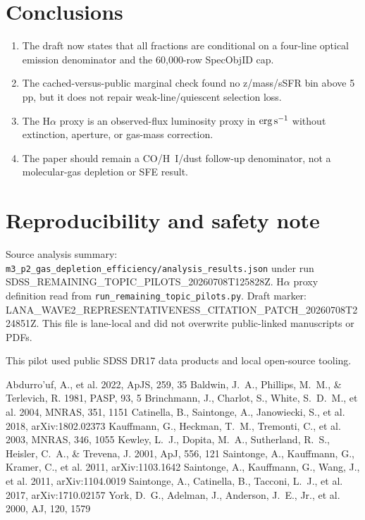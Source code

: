 \documentclass[twocolumn]{aastex631}
\begin{document}
\section{Conclusions}\label{sec:m3p2-conclusions}
\begin{enumerate}
\item The draft now states that all fractions are conditional on a four-line optical emission denominator and the 60,000-row SpecObjID cap.
\item The cached-versus-public marginal check found no z/mass/sSFR bin above 5 pp, but it does not repair weak-line/quiescent selection loss.
\item The H$\alpha$ proxy is an observed-flux luminosity proxy in ${\rm erg\,s^{-1}}$ without extinction, aperture, or gas-mass correction.
\item The paper should remain a CO/H~I/dust follow-up denominator, not a molecular-gas depletion or SFE result.
\end{enumerate}

\section*{Reproducibility and safety note}
Source analysis summary: \texttt{m3\_p2\_gas\_depletion\_efficiency/analysis\_results.json} under run SDSS\_REMAINING\_TOPIC\_PILOTS\_20260708T125828Z.  H$\alpha$ proxy definition read from \texttt{run\_remaining\_topic\_pilots.py}.  Draft marker: LANA\_WAVE2\_REPRESENTATIVENESS\_CITATION\_PATCH\_20260708T224851Z.  This file is lane-local and did not overwrite public-linked manuscripts or PDFs.

\acknowledgments
This pilot used public SDSS DR17 data products and local open-source tooling.

\begin{thebibliography}{}
 Abdurro'uf, A., et al. 2022, ApJS, 259, 35
 Baldwin, J.~A., Phillips, M.~M., \& Terlevich, R. 1981, PASP, 93, 5
 Brinchmann, J., Charlot, S., White, S.~D.~M., et al. 2004, MNRAS, 351, 1151
 Catinella, B., Saintonge, A., Janowiecki, S., et al. 2018, arXiv:1802.02373
 Kauffmann, G., Heckman, T.~M., Tremonti, C., et al. 2003, MNRAS, 346, 1055
 Kewley, L.~J., Dopita, M.~A., Sutherland, R.~S., Heisler, C.~A., \& Trevena, J. 2001, ApJ, 556, 121
 Saintonge, A., Kauffmann, G., Kramer, C., et al. 2011, arXiv:1103.1642
 Saintonge, A., Kauffmann, G., Wang, J., et al. 2011, arXiv:1104.0019
 Saintonge, A., Catinella, B., Tacconi, L.~J., et al. 2017, arXiv:1710.02157
 York, D.~G., Adelman, J., Anderson, J.~E., Jr., et al. 2000, AJ, 120, 1579
\end{thebibliography}
\end{document}
